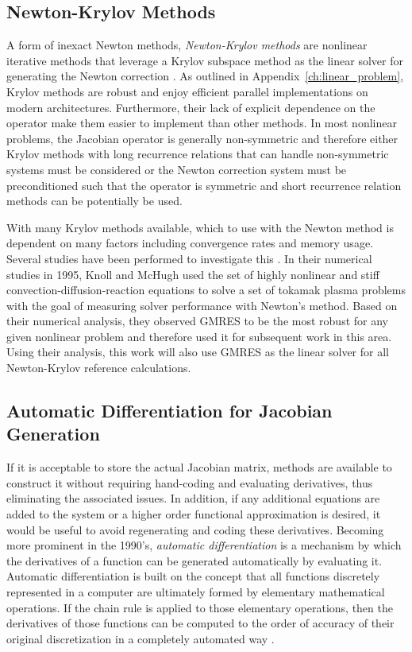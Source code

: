 \subsection{Newton-Krylov Methods\ }
\label{subsec:newton_krylov_methods}
A form of inexact Newton methods, \textit{Newton-Krylov methods} are
nonlinear iterative methods that leverage a Krylov subspace method as
the linear solver for generating the Newton correction
\cite{kelley_iterative_1995}. As outlined in
Appendix~\ref{ch:linear_problem}, Krylov methods are robust and enjoy
efficient parallel implementations on modern
architectures. Furthermore, their lack of explicit dependence on the
operator make them easier to implement than other methods. In most
nonlinear problems, the Jacobian operator is generally non-symmetric
and therefore either Krylov methods with long recurrence relations
that can handle non-symmetric systems must be considered or the Newton
correction system must be preconditioned such that the operator is
symmetric and short recurrence relation methods can be potentially be
used.

With many Krylov methods available, which to use with the Newton
method is dependent on many factors including convergence rates and
memory usage. Several studies have been performed to investigate this
\cite{mchugh_inexact_1993,knoll_newton-krylov_1995}. In their
numerical studies in 1995, Knoll and McHugh used the set of highly
nonlinear and stiff convection-diffusion-reaction equations to solve a
set of tokamak plasma problems with the goal of measuring solver
performance with Newton's method. Based on their numerical analysis,
they observed GMRES to be the most robust for any given nonlinear
problem and therefore used it for subsequent work in this area. Using
their analysis, this work will also use GMRES as the linear solver for
all Newton-Krylov reference calculations.

\subsection{Automatic Differentiation for Jacobian Generation}
\label{subsec:automatic_differentiation}
If it is acceptable to store the actual Jacobian matrix, methods are
available to construct it without requiring hand-coding and evaluating
derivatives, thus eliminating the associated issues. In addition, if
any additional equations are added to the system or a higher order
functional approximation is desired, it would be useful to avoid
regenerating and coding these derivatives. Becoming more prominent in
the 1990's, \textit{automatic differentiation} is a mechanism by which
the derivatives of a function can be generated automatically by
evaluating it. Automatic differentiation is built on the concept that
all functions discretely represented in a computer are ultimately
formed by elementary mathematical operations. If the chain rule is
applied to those elementary operations, then the derivatives of those
functions can be computed to the order of accuracy of their original
discretization in a completely automated way
\cite{averick_computing_1994}.

